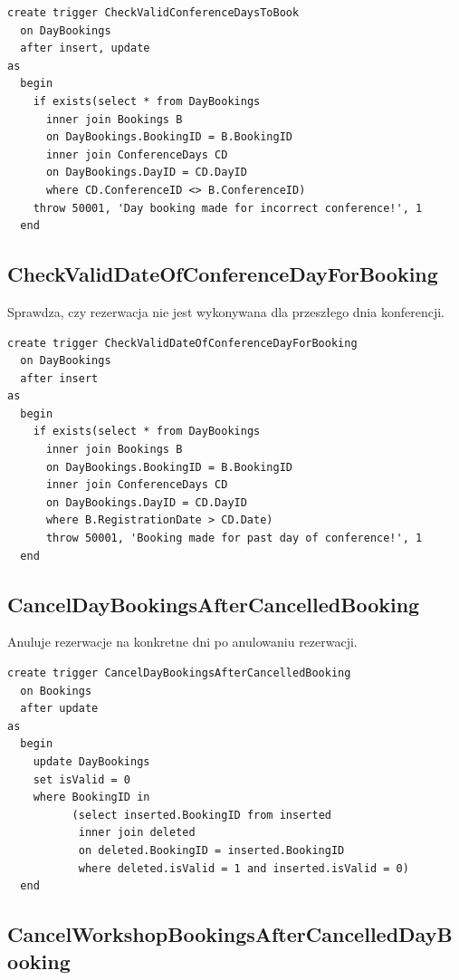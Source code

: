 \documentclass[12pt, a4paper]{mwrep}
\begin{document}
\begin{lstlisting}
create trigger CheckValidConferenceDaysToBook
  on DayBookings
  after insert, update
as
  begin
    if exists(select * from DayBookings
      inner join Bookings B 
      on DayBookings.BookingID = B.BookingID
      inner join ConferenceDays CD 
      on DayBookings.DayID = CD.DayID
      where CD.ConferenceID <> B.ConferenceID)
    throw 50001, 'Day booking made for incorrect conference!', 1
  end
\end{lstlisting}

\subsection{CheckValidDateOfConferenceDayForBooking}

\noindent Sprawdza, czy rezerwacja nie jest wykonywana dla przeszłego dnia konferencji.

\begin{lstlisting}
create trigger CheckValidDateOfConferenceDayForBooking
  on DayBookings
  after insert
as
  begin
    if exists(select * from DayBookings
      inner join Bookings B 
      on DayBookings.BookingID = B.BookingID
      inner join ConferenceDays CD 
      on DayBookings.DayID = CD.DayID
      where B.RegistrationDate > CD.Date)
      throw 50001, 'Booking made for past day of conference!', 1
  end
\end{lstlisting}

\subsection{CancelDayBookingsAfterCancelledBooking}

\noindent Anuluje rezerwacje na konkretne dni po anulowaniu rezerwacji.

\begin{lstlisting}
create trigger CancelDayBookingsAfterCancelledBooking
  on Bookings
  after update
as
  begin
    update DayBookings
    set isValid = 0
    where BookingID in
          (select inserted.BookingID from inserted
           inner join deleted
           on deleted.BookingID = inserted.BookingID
           where deleted.isValid = 1 and inserted.isValid = 0)
  end
\end{lstlisting}

\subsection{CancelWorkshopBookingsAfterCancelledDayBooking}
\end{document}
